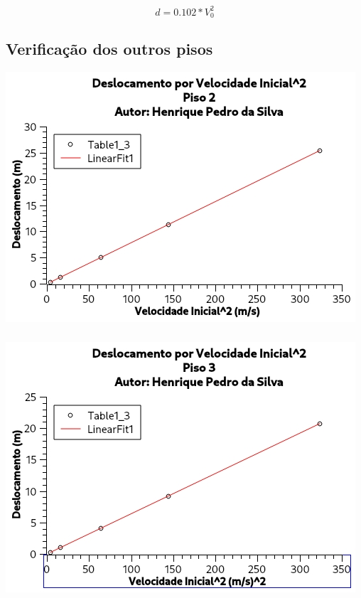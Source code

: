 \documentclass[12pt,twoside, a4paper, twocolumn]{article}
\begin{document}
\begin{equation}
    d = 0.102 * V_0^2
\end{equation}

\subsection{Verificação dos outros pisos}

\begin{adjustbox}{scale=0.75}
    \includegraphics{Grafico-2.jpg}
\end{adjustbox}
\subparagraph*{}
\begin{adjustbox}{scale=0.75}
    \includegraphics{Grafico-3.jpg}
\end{adjustbox}
\subparagraph*{}
\end{document}
